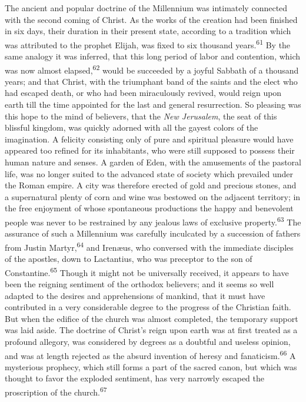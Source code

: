 The ancient and popular doctrine of the Millennium was intimately
connected with the second coming of Christ. As the works of the
creation had been finished in six days, their duration in their
present state, according to a tradition which was attributed to
the prophet Elijah, was fixed to six thousand years.\textsuperscript{61} By the
same analogy it was inferred, that this long period of labor and
contention, which was now almost elapsed,\textsuperscript{62} would be succeeded
by a joyful Sabbath of a thousand years; and that Christ, with
the triumphant band of the saints and the elect who had escaped
death, or who had been miraculously revived, would reign upon
earth till the time appointed for the last and general
resurrection. So pleasing was this hope to the mind of believers,
that the \textit{New Jerusalem}, the seat of this blissful kingdom, was
quickly adorned with all the gayest colors of the imagination. A
felicity consisting only of pure and spiritual pleasure would
have appeared too refined for its inhabitants, who were still
supposed to possess their human nature and senses. A garden of
Eden, with the amusements of the pastoral life, was no longer
suited to the advanced state of society which prevailed under the
Roman empire. A city was therefore erected of gold and precious
stones, and a supernatural plenty of corn and wine was bestowed
on the adjacent territory; in the free enjoyment of whose
spontaneous productions the happy and benevolent people was never
to be restrained by any jealous laws of exclusive property.\textsuperscript{63}
The assurance of such a Millennium was carefully inculcated by a
succession of fathers from Justin Martyr,\textsuperscript{64} and Irenæus, who
conversed with the immediate disciples of the apostles, down to
Lactantius, who was preceptor to the son of Constantine.\textsuperscript{65}
Though it might not be universally received, it appears to have
been the reigning sentiment of the orthodox believers; and it
seems so well adapted to the desires and apprehensions of
mankind, that it must have contributed in a very considerable
degree to the progress of the Christian faith. But when the
edifice of the church was almost completed, the temporary support
was laid aside. The doctrine of Christ’s reign upon earth was at
first treated as a profound allegory, was considered by degrees
as a doubtful and useless opinion, and was at length rejected as
the absurd invention of heresy and fanaticism.\textsuperscript{66} A mysterious
prophecy, which still forms a part of the sacred canon, but which
was thought to favor the exploded sentiment, has very narrowly
escaped the proscription of the church.\textsuperscript{67}

